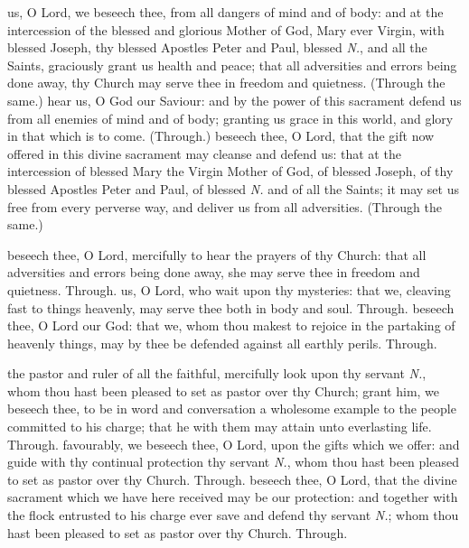 \begin{multicols}{2}
    \label{SPSaints}
     us, O Lord, we beseech thee, from all dangers of mind and of body: and at the intercession of the blessed and glorious Mother of God, Mary ever Virgin, with blessed Joseph, thy blessed Apostles Peter and Paul, blessed \emph{N.}, and all the Saints, graciously grant us health and peace; that all adversities and errors being done away, thy Church may serve thee in freedom and quietness. (Through the same.)
     hear us, O God our Saviour: and by the power of this sacrament defend us from all enemies of mind and of body; granting us grace in this world, and glory in that which is to come. (Through.)
     beseech thee, O Lord, that the gift now offered in this divine sacrament may cleanse and defend us: that at the intercession of blessed Mary the Virgin Mother of God, of blessed Joseph, of thy blessed Apostles Peter and Paul, of blessed \emph{N.} and of all the Saints; it may set us free from every perverse way, and deliver us from all adversities. (Through the same.)
    
   \label{SPAgainst}
    beseech thee, O Lord, mercifully to hear the prayers of thy Church: that all adversities and errors being done away, she may serve thee in freedom and quietness. Through.
    us, O Lord, who wait upon thy mysteries: that we, cleaving fast to things heavenly, may serve thee both in body and soul. Through.
    beseech thee, O Lord our God: that we, whom thou makest to rejoice in the partaking of heavenly things, may by thee be defended against all earthly perils. Through.
   
   \label{SPChiefBishop}
    the pastor and ruler of all the faithful, mercifully look upon thy servant \emph{N.}, whom thou hast been pleased to set as pastor over thy Church; grant him, we beseech thee, to be in word and conversation a wholesome example to the people committed to his charge; that he with them may attain unto everlasting life. Through.
    favourably, we beseech thee, O Lord, upon the gifts which we offer: and guide with thy continual protection thy servant \textit{N.}, whom thou hast been pleased to set as pastor over thy Church. Through.
    beseech thee, O Lord, that the divine sacrament which we have here received may be our protection: and together with the flock entrusted to his charge ever save and defend thy servant \textit{N.}; whom thou hast been pleased to set as pastor over thy Church. Through.
   

\end{multicols}
